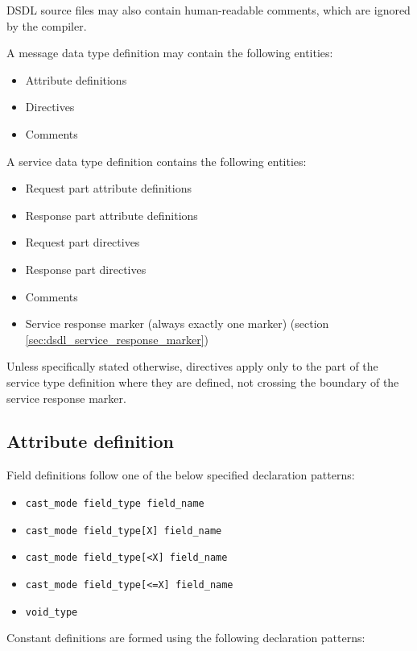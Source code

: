 DSDL source files may also contain human-readable comments, which are ignored by the compiler.

A message data type definition may contain the following entities:

\begin{itemize}
    \item Attribute definitions
    \item Directives
    \item Comments
\end{itemize}

A service data type definition contains the following entities:

\begin{itemize}
    \item Request part attribute definitions
    \item Response part attribute definitions
    \item Request part directives
    \item Response part directives
    \item Comments
    \item Service response marker (always exactly one marker) (section \ref{sec:dsdl_service_response_marker})
\end{itemize}

Unless specifically stated otherwise,
directives apply only to the part of the service type definition where they are defined,
not crossing the boundary of the service response marker.

\subsection{Attribute definition}

Field definitions follow one of the below specified declaration patterns:

\begin{itemize}
    \item \verb|cast_mode field_type field_name|
    \item \verb|cast_mode field_type[X] field_name|
    \item \verb|cast_mode field_type[<X] field_name|
    \item \verb|cast_mode field_type[<=X] field_name|
    \item \verb|void_type|
\end{itemize}

Constant definitions are formed using the following declaration patterns:

